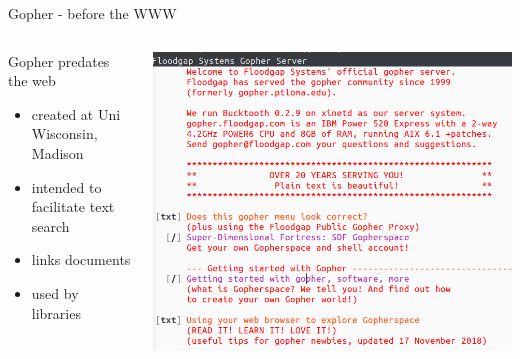 \documentclass[presentation, 11pt,  aspectratio=169]{beamer}
\begin{document}
\begin{frame}[label={sec:org10aee87}]{Gopher - before the WWW}
\begin{columns}
\begin{column}{0.3\columnwidth}
\begin{block}{Gopher predates the web}
\begin{itemize}
\item created at Uni Wisconsin, Madison\\
\item intended to facilitate text search\\
\item links documents\\
\item used by libraries\\
\end{itemize}
\end{block}
\end{column}

\begin{column}{0.70\columnwidth}
\begin{center}
\includegraphics[height=0.85\textheight]{images/Gopher-1.png}
\end{center}
\end{column}
\end{columns}
\end{frame}
\end{document}
